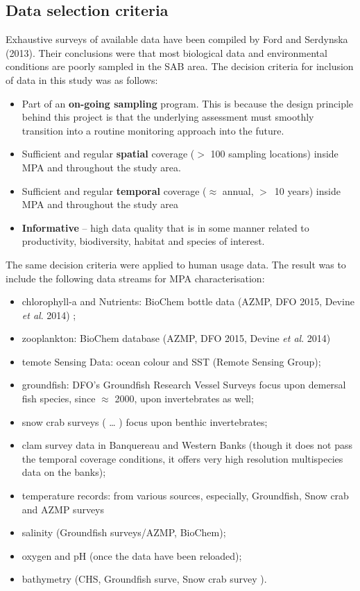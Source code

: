 \documentclass[letterpaper,portrait,11pt]{scrartcl}
\numberwithin{equation}{section}		%
\numberwithin{figure}{section}		%
\numberwithin{table}{section}				%
\begin{document}
\subsection{Data selection criteria}
Exhaustive surveys of available data have been compiled by Ford and Serdynska (2013). Their conclusions were that most biological data and environmental conditions are poorly sampled in the SAB area. The decision criteria for inclusion of data in this study was as follows:

\begin{itemize}
	\item Part of an \textbf{on-going sampling} program. This is because the design principle behind this project is that the underlying assessment must smoothly transition into a routine monitoring approach into the future.
  \item	Sufficient and regular \textbf{spatial} coverage ($>$ 100 sampling locations) inside MPA and throughout the study area.
  \item Sufficient and regular \textbf{temporal} coverage ($\approx$ annual, $>$~10 years) inside MPA and throughout the study area
  \item \textbf{Informative} -- high data quality that is in some manner related to productivity, biodiversity, habitat and species of interest.
\end{itemize}

The same decision criteria were applied to human usage data. The result was to include the following data streams for MPA characterisation:

\begin{itemize}
	\item chlorophyll-a and Nutrients: BioChem bottle data (AZMP, DFO 2015, Devine \textit{et al}. 2014) ;
  \item zooplankton: BioChem database (AZMP, DFO 2015, Devine \textit{et al}. 2014) 
  \item temote Sensing Data: ocean colour and SST (Remote Sensing Group);
  \item groundfish: DFO's Groundfish Research Vessel Surveys focus upon demersal fish species, since $\approx$ 2000, upon invertebrates as well;
  \item snow crab surveys ( \ldots{} ) focus upon benthic invertebrates;
  \item clam survey data in Banquereau and Western Banks (though it does not pass the temporal coverage conditions, it offers very high resolution multispecies data on the banks);
  \item temperature records: from various sources, especially, Groundfish, Snow crab and AZMP surveys
  \item salinity (Groundfish surveys/AZMP, BioChem);
  \item oxygen and pH (once the data have been reloaded);
  \item bathymetry (CHS, Groundfish surve, Snow crab survey ).
\end{itemize}
\end{document}
